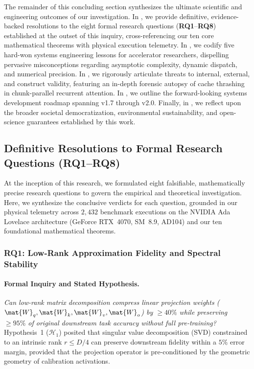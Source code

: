 The remainder of this concluding section synthesizes the ultimate scientific and engineering outcomes of our investigation.
In , we provide definitive, evidence-backed resolutions to the eight formal research questions (\textbf{RQ1}--\textbf{RQ8}) established at the outset of this inquiry, cross-referencing our ten core mathematical theorems with physical execution telemetry.
In , we codify five hard-won systems engineering lessons for accelerator researchers, dispelling pervasive misconceptions regarding asymptotic complexity, dynamic dispatch, and numerical precision.
In , we rigorously articulate threats to internal, external, and construct validity, featuring an in-depth forensic autopsy of cache thrashing in chunk-parallel recurrent attention.
In , we outline the forward-looking systems development roadmap spanning \neuralops{} v1.7 through v2.0.
Finally, in , we reflect upon the broader societal democratization, environmental sustainability, and open-science guarantees established by this work.

\subsection{Definitive Resolutions to Formal Research Questions (RQ1--RQ8)}
\label{subsec:rq_resolutions}

At the inception of this research, we formulated eight falsifiable, mathematically precise research questions to govern the empirical and theoretical investigation.
Here, we synthesize the conclusive verdicts for each question, grounded in our physical telemetry across $2{,}432$ benchmark executions on the NVIDIA Ada Lovelace architecture (GeForce RTX~4070, SM~8.9, AD104) and our ten foundational mathematical theorems.

\subsubsection{RQ1: Low-Rank Approximation Fidelity and Spectral Stability}
\label{subsubsec:res_rq1}

\paragraph{Formal Inquiry and Stated Hypothesis.}
\emph{Can low-rank matrix decomposition compress linear projection weights ($\mat{W}_q, \mat{W}_k, \mat{W}_v, \mat{W}_o$) by $\ge 40\%$ while preserving $\ge 95\%$ of original downstream task accuracy without full pre-training?}
Hypothesis~1 ($\mathcal{H}_1$) posited that singular value decomposition (SVD) constrained to an intrinsic rank $r \le D/4$ can preserve downstream fidelity within a $5\%$ error margin, provided that the projection operator is pre-conditioned by the geometric geometry of calibration activations.

